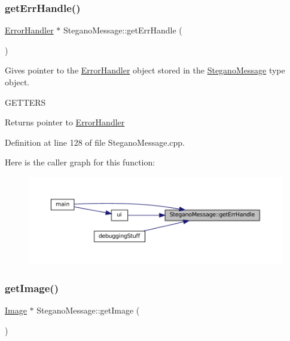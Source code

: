 \subsubsection{\texorpdfstring{getErrHandle()}{getErrHandle()}}
{\footnotesize\ttfamily \mbox{\hyperlink{classErrorHandler}{Error\+Handler}} $\ast$ Stegano\+Message\+::get\+Err\+Handle (\begin{DoxyParamCaption}{ }\end{DoxyParamCaption})}



Gives pointer to the \mbox{\hyperlink{classErrorHandler}{Error\+Handler}} object stored in the \mbox{\hyperlink{classSteganoMessage}{Stegano\+Message}} type object. 

G\+E\+T\+T\+E\+RS\begin{DoxyReturn}{Returns}
pointer to \mbox{\hyperlink{classErrorHandler}{Error\+Handler}} 
\end{DoxyReturn}


Definition at line 128 of file Stegano\+Message.\+cpp.

Here is the caller graph for this function\+:
\nopagebreak
\begin{figure}[H]
\begin{center}
\leavevmode
\includegraphics[width=350pt]{classSteganoMessage_a0134757a8c79caa9dca9bcce0686d1ef_icgraph}
\end{center}
\end{figure}
\mbox{\label{classSteganoMessage_a2e3ad705a0219edfd2150f3f7931979c}} 
\subsubsection{\texorpdfstring{getImage()}{getImage()}}
{\footnotesize\ttfamily \mbox{\hyperlink{classImage}{Image}} $\ast$ Stegano\+Message\+::get\+Image (\begin{DoxyParamCaption}{ }\end{DoxyParamCaption})}



